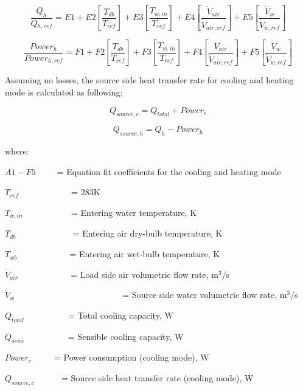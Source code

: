 \begin{equation}
\frac{{{Q_h}}}{{Q{}_{h,ref}}} = E1 + E2\left[ {\frac{{{T_{db}}}}{{{T_{ref}}}}} \right] + E3\left[ {\frac{{T{}_{w,in}}}{{T{}_{ref}}}} \right] + E4\left[ {\frac{{{{\dot V}_{air}}}}{{{{\dot V}_{air,ref}}}}} \right] + E5\left[ {\frac{{{{\dot V}_w}}}{{{{\dot V}_{w,ref}}}}} \right]
\end{equation}

\begin{equation}
\frac{{Power{_h}}}{{Power{}_{h,ref}}} = F1 + F2\left[ {\frac{{{T_{db}}}}{{{T_{ref}}}}} \right] + F3\left[ {\frac{{T{}_{w,in}}}{{T{}_{ref}}}} \right] + F4\left[ {\frac{{{{\dot V}_{air}}}}{{{{\dot V}_{air,ref}}}}} \right] + F5\left[ {\frac{{{{\dot V}_w}}}{{{{\dot V}_{w,ref}}}}} \right]
\end{equation}

Assuming no losses, the source side heat transfer rate for cooling and heating mode is calculated as following;

\begin{equation}
{Q_{source,c}} = {Q_{total}} + Powe{r_c}
\end{equation}

\begin{equation}
{Q_{source,h}} = {Q_h} - Powe{r_h}
\end{equation}

where:

\(A1 - F5\) ~ ~~ = Equation fit coefficients for the cooling and heating mode

\({T_{ref}}\) ~~~~~~~~~~~ = 283K

\({T_{w,in}}\) ~~~~~~~~~~ = Entering water temperature, K

\({T_{db}}\) ~~~~~~~~~~~~ = Entering air dry-bulb temperature, K

\({T_{wb}}\) ~~~~~~~~~~~ = Entering air wet-bulb temperature, K

\({\dot V_{air}}\) ~~~~~~~~~~~ = Load side air volumetric flow rate, m\(^{3}\)/s

\({\dot V_w}\) ~~~~~~~~~~~~~~~~~~~~~~~~ = Source side water volumetric flow rate, m\(^{3}\)/s

\({Q_{total}}\) ~~~~~~~~~ = Total cooling capacity, W

\({Q_{sens}}\) ~~~~~~~~~ = Sensible cooling capacity, W

\(Powe{r_c}\) ~~~~ = Power consumption (cooling mode), W

\({Q_{source,c}}\) ~~~~~ = Source side heat transfer rate (cooling mode), W

